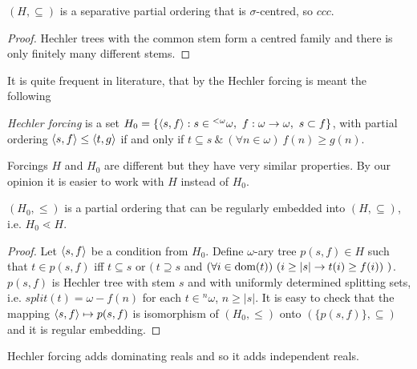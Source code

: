 \begin{fact}
 $(H,\subseteq)$ is a separative partial ordering that is $\sigma$-centred,
so $ccc$.
\end{fact}

\begin{proof}
 Hechler trees with the common stem form a centred family and there is
only finitely many different stems.
\end{proof}

It is quite frequent in literature, that by the Hechler forcing
is meant the following

\begin{definition}
\emph{Hechler forcing} is a set
 $H_0 = \{\<s,f\> : s \in {}^{<\omega} \omega,\ f : \omega \to \omega,\ s \subset f \}$, with
partial ordering
$\langle s,f\rangle \leq \langle t,g\rangle$ if and only if $t \subseteq s \ \& \ (\forall n \in \omega) \ f(n) \geq g(n)$.
\end{definition}

Forcings $H$ and $H_0$ are different but they have very similar
properties. By our opinion it is easier to work with $H$ instead of
$H_0$.

\begin{proposition}
 $(H_0,\leq)$ is a partial ordering that can be regularly embedded
into $(H,\subseteq)$, i.e. $H_0 \lessdot H$.
\end{proposition}

\begin{proof}
 Let $\langle s,f\rangle$ be a condition from $H_0$.
 Define $\omega$-ary tree $p(s,f) \in H$ such that
 $t \in p(s,f)$ iff $t \subseteq s$ or $(\ t \supseteq s$ and
$(\forall i \in \hbox{dom}(t))\ (i \geq |s| \to t(i) \geq f(i)) \ )$.
 $p(s,f)$ is Hechler tree with stem $s$ and with uniformly
 determined splitting sets, i.e. $split(t) = \omega - f(n)$ for
each $t \in {}^n \omega$, $n \geq |s|$. It is easy to check
that the mapping $\langle s,f\rangle \mapsto p(s,f)$ is isomorphism
of $(H_0,\leq)$ onto $(\{ p(s,f)\},\subseteq)$ and it is
regular embedding.
\end{proof}


\begin{lemma}
 Hechler forcing adds dominating reals and so it adds independent reals.
\end{lemma}

